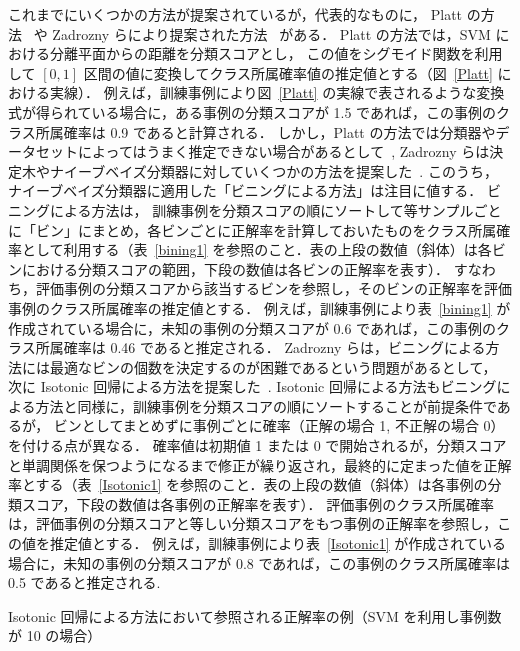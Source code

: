 \documentclass[japanese]{jnlp_1.4}
\begin{document}
これまでにいくつかの方法が提案されているが，代表的なものに，
Platt の方法~\cite{Platt99} や Zadrozny らにより提案された方法~\cite{Zadrozny01a,Zadrozny01b,Zadrozny02,Zadrozny05} がある． 
Platt の方法では，SVM における分離平面からの距離を分類スコアとし，
この値をシグモイド関数を利用して $[0,1]$ 区間の値に変換してクラス所属確率値の推定値とする（図~\ref{Platt} における実線）．
例えば，訓練事例により図~\ref{Platt} の実線で表されるような変換式が得られている場合に，ある事例の分類スコアが 1.5 であれば，この事例のクラス所属確率は 0.9 であると計算される．
しかし，Platt の方法では分類器やデータセットによってはうまく推定できない場合があるとして~\cite{Bennett00,Zadrozny01b}, 
Zadrozny らは決定木やナイーブベイズ分類器に対していくつかの方法を提案した~\cite{Zadrozny01a,Zadrozny01b}. 
このうち，
ナイーブベイズ分類器に適用した「ビニングによる方法」は注目に値する．
ビニングによる方法は，
訓練事例を分類スコアの順にソートして等サンプルごとに「ビン」にまとめ，各ビンごとに正解率を計算しておいたものをクラス所属確率として利用する（表~\ref{bining1} を参照のこと．表の上段の数値（斜体）は各ビンにおける分類スコアの範囲，下段の数値は各ビンの正解率を表す）． 
すなわち，評価事例の分類スコアから該当するビンを参照し，そのビンの正解率を評価事例のクラス所属確率の推定値とする．
例えば，訓練事例により表~\ref{bining1} が作成されている場合に，未知の事例の分類スコアが 0.6 であれば，この事例のクラス所属確率は 0.46 であると推定される．
Zadrozny らは，ビニングによる方法には最適なビンの個数を決定するのが困難であるという問題があるとして，
次に Isotonic 回帰による方法を提案した~\cite{Zadrozny02}. 
Isotonic 回帰による方法もビニングによる方法と同様に，訓練事例を分類スコアの順にソートすることが前提条件であるが，
ビンとしてまとめずに事例ごとに確率（正解の場合 1, 不正解の場合 0）を付ける点が異なる．
確率値は初期値 1 または 0 で開始されるが，分類スコアと単調関係を保つようになるまで修正が繰り返され，最終的に定まった値を正解率とする（表~\ref{Isotonic1} を参照のこと．表の上段の数値（斜体）は各事例の分類スコア，下段の数値は各事例の正解率を表す）．
評価事例のクラス所属確率は，評価事例の分類スコアと等しい分類スコアをもつ事例の正解率を参照し，この値を推定値とする．
例えば，訓練事例により表~\ref{Isotonic1} が作成されている場合に，未知の事例の分類スコアが 0.8 であれば，この事例のクラス所属確率は 0.5 であると推定される.

\begin{table}[b]
\begin{center}
\caption{Isotonic 回帰による方法において参照される正解率の例（SVM を利用し事例数が 10 の場合）}
\label{Isotonic1}

\end{center}
\end{table}
\end{document}
